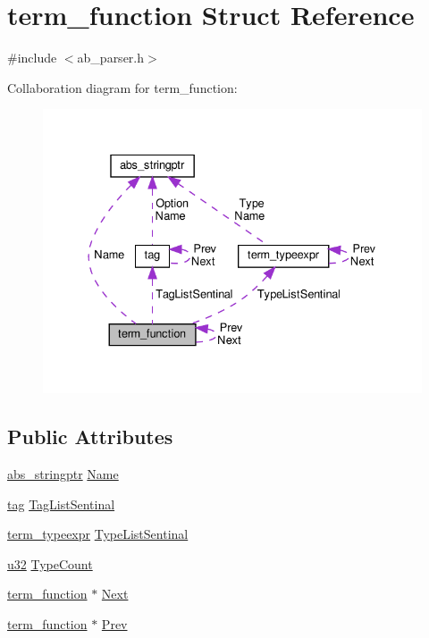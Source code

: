 \hypertarget{structterm__function}{}\section{term\+\_\+function Struct Reference}
\label{structterm__function}


{\ttfamily \#include $<$ab\+\_\+parser.\+h$>$}



Collaboration diagram for term\+\_\+function\+:\nopagebreak
\begin{figure}[H]
\begin{center}
\leavevmode
\includegraphics[width=332pt]{d0/dd8/structterm__function__coll__graph}
\end{center}
\end{figure}
\subsection*{Public Attributes}
\begin{DoxyCompactItemize}
\item 
\hyperlink{structabs__stringptr}{abs\+\_\+stringptr} \hyperlink{structterm__function_a44d4f15308d31174ac9443aeefe9544a}{Name}
\item 
\hyperlink{structtag}{tag} \hyperlink{structterm__function_ab3a3bd4264776e6fe2d04b161bd62433}{Tag\+List\+Sentinal}
\item 
\hyperlink{structterm__typeexpr}{term\+\_\+typeexpr} \hyperlink{structterm__function_a96b877553f990184a9da245207de9524}{Type\+List\+Sentinal}
\item 
\hyperlink{ab__common_8h_afaa62991928fb9fb18ff0db62a040aba}{u32} \hyperlink{structterm__function_a4e47cbfb96047c0ed4e06e87e079fb6a}{Type\+Count}
\item 
\hyperlink{structterm__function}{term\+\_\+function} $\ast$ \hyperlink{structterm__function_a655992a45b7bc18c8208d9a058bb86e6}{Next}
\item 
\hyperlink{structterm__function}{term\+\_\+function} $\ast$ \hyperlink{structterm__function_aab58e6419571c457d2b7563724bed629}{Prev}
\end{DoxyCompactItemize}


